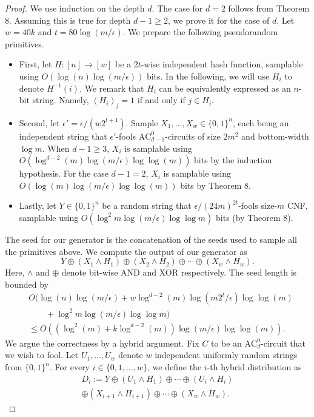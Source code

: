 \documentclass[10pt,a4paper]{article}
\begin{document}
\begin{proof}We use induction on the depth $d$. The case for $d=2$ follows from Theorem 8. Assuming this is true for depth $d-1\ge2$, we prove it for the case of $d$. Let $w=40k$ and $t=80\log(m/\epsilon)$. We prepare the following pseudorandom primitives.
\begin{itemize}\item First, let $H:[n]\to[w]$ be a $2t$-wise independent hash function, samplable using $O(\log(n)\log(m/\epsilon))$ bits. In the following, we will use $H_i$ to denote $H^{-1}(i)$. We remark that $H_i$ can be equivalently expressed as an $n$-bit string. Namely, $(H_i)_j=1$ if and only if $j\in H_i$.
\item Second, let $\epsilon'=\epsilon/(w2^{t+1})$. Sample $X_1,\ldots,X_w\in\{0,1\}^n$, each being an independent string that $\epsilon'$-fools $\mathrm{AC}^0_{d-1}$-circuits of size $2m^2$ and bottom-width $\log m$. When $d-1\ge3$, $X_i$ is samplable using $O(\log^{d-2}(m)\log(m/\epsilon)\log\log(m))$ bits by the induction hypothesis. For the case $d-1=2$, $X_i$ is samplable using $O(\log(m)\log(m/\epsilon)\log\log(m))$ bits by Theorem 8.
\item Lastly, let $Y\in\{0,1\}^n$ be a random string that $\epsilon/(24m)^{2t}$-fools size-$m$ CNF, samplable using $O(\log^2m\log(m/\epsilon)\log\log m)$ bits (by Theorem 8).\end{itemize}
The seed for our generator is the concatenation of the seeds used to sample all the primitives above. We compute the output of our generator as
\[Y\oplus(X_1\land H_1)\oplus(X_2\land H_2)\oplus\cdots\oplus(X_w\land H_w).\tag{1}\]
Here, $\land$ and $\oplus$ denote bit-wise AND and XOR respectively. The seed length is bounded by
\begin{align*}&O(\log(n)\log(m/\epsilon)+w\log^{d-2}(m)\log(m2^t/\epsilon)\log\log(m)\\&\qquad+\log^2m\log(m/\epsilon)\log\log m)\\&\le O((\log^2(m)+k\log^{d-2}(m))\log(m/\epsilon)\log\log(m)).\end{align*}
We argue the correctness by a hybrid argument. Fix $C$ to be an $\mathrm{AC}^0_d$-circuit that we wish to fool. Let $U_1,\ldots,U_w$ denote $w$ independent uniformly random strings from $\{0,1\}^n$. For every $i\in\{0,1,\ldots,w\}$, we define the $i$-th hybrid distribution as
\begin{multline*}D_i:=Y\oplus(U_1\land H_1)\oplus\cdots\oplus(U_i\land H_i)\\\oplus(X_{i+1}\land H_{i+1})\oplus\cdots\oplus(X_w\land H_w).\tag{2}\end{multline*}

\end{proof}
\end{document}
